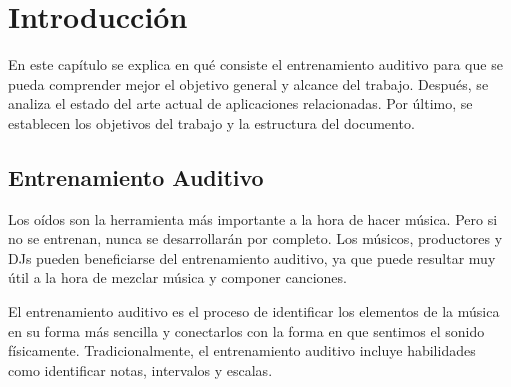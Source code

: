 \documentclass[12pt,twoside,titlepage]{report}
\begin{document}
  


\pagestyle{fancy}
\renewcommand{\chaptermark}[1]{\markboth{Capítulo \thechapter.\ #1}{}}
\pagestyle{fancy}
\fancyhf{}
\fancyhead[LO]{\leftmark}
\fancyhead[RO]{}
\fancyhead[RE]{\nouppercase\rightmark}
\fancyhead[LE]{}
\fancyfoot[C]{\thepage}


   


\chapter{Introducción}

En este capítulo se explica en qué consiste el entrenamiento auditivo para que se pueda comprender mejor el objetivo general y alcance del trabajo. Después, se analiza el estado del arte actual de aplicaciones relacionadas. Por último, se establecen los objetivos del trabajo y la estructura del documento.

\pagestyle{fancy}

\setlength{\parskip}{0.75em}
\renewcommand{\baselinestretch}{1.25}


\setcounter{page}{1}

\section{Entrenamiento Auditivo}
\label{sec:eartraining}

Los oídos son la herramienta más importante a la hora de hacer música. Pero si no se entrenan, nunca se desarrollarán por completo. Los músicos, productores y DJs pueden beneficiarse del entrenamiento auditivo, ya que puede resultar muy útil a la hora de mezclar música y componer canciones.

El entrenamiento auditivo es el proceso de identificar los elementos de la música en su forma más sencilla y conectarlos con la forma en que sentimos el sonido físicamente. Tradicionalmente, el entrenamiento auditivo incluye habilidades como identificar notas, intervalos y escalas. 
\end{document}
